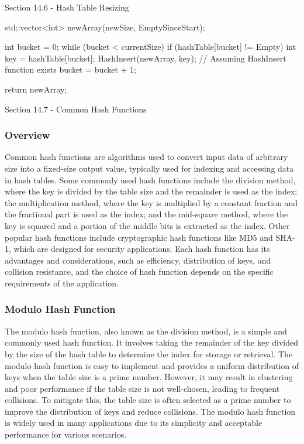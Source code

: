 \begin{notes}{Section 14.6 - Hash Table Resizing}
\begin{highlight}
\begin{code}[C++]
{        std::vector<int> newArray(newSize, EmptySinceStart);
    
        int bucket = 0;
        while (bucket < currentSize) {
            if (hashTable[bucket] != Empty) {
                int key = hashTable[bucket];
                HashInsert(newArray, key); // Assuming HashInsert function exists
            }
            bucket = bucket + 1;
        }
    
        return newArray;
    }
    \end{code}
    \end{highlight}
\end{notes}

\begin{notes}{Section 14.7 - Common Hash Functions}
    \subsubsection*{Overview}

    Common hash functions are algorithms used to convert input data of arbitrary size into a fixed-size output value, typically used for indexing and accessing data in hash tables. Some commonly used hash functions 
    include the division method, where the key is divided by the table size and the remainder is used as the index; the multiplication method, where the key is multiplied by a constant fraction and the fractional 
    part is used as the index; and the mid-square method, where the key is squared and a portion of the middle bits is extracted as the index. Other popular hash functions include cryptographic hash functions like 
    MD5 and SHA-1, which are designed for security applications. Each hash function has its advantages and considerations, such as efficiency, distribution of keys, and collision resistance, and the choice of hash 
    function depends on the specific requirements of the application.
    
    \subsubsection*{Modulo Hash Function}
    
    The modulo hash function, also known as the division method, is a simple and commonly used hash function. It involves taking the remainder of the key divided by the size of the hash table to determine the index 
    for storage or retrieval. The modulo hash function is easy to implement and provides a uniform distribution of keys when the table size is a prime number. However, it may result in clustering and poor performance 
    if the table size is not well-chosen, leading to frequent collisions. To mitigate this, the table size is often selected as a prime number to improve the distribution of keys and reduce collisions. The modulo hash 
    function is widely used in many applications due to its simplicity and acceptable performance for various scenarios.
    

\end{notes}
